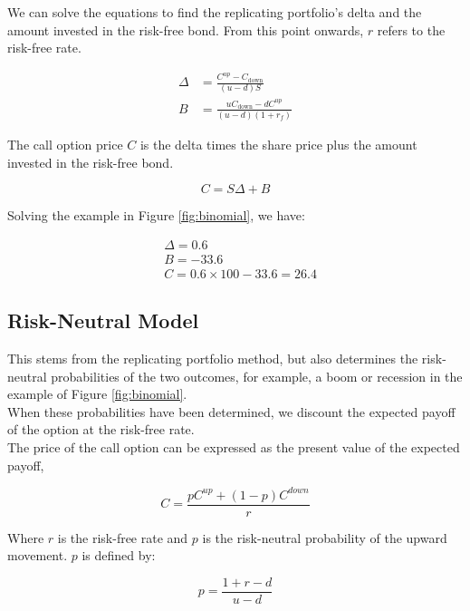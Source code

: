 We can solve the equations to find the replicating portfolio's delta and the amount invested in the risk-free bond. From this point onwards, $r$ refers to the risk-free rate.

\begin{align}
    \Delta&=\frac{C^{up}-C_{\mathrm{down}}}{(u-d)S}\\
    B     &=\frac{uC_{\mathrm{down}}-dC^{up}}{(u-d)(1+r_f)}
\end{align}

The call option price $C$ is the delta times the share price plus the amount invested in the risk-free bond.

\begin{equation}
    C = S\Delta + B
\end{equation}

Solving the example in Figure \ref{fig:binomial}, we have:

\begin{align*}
    &\Delta=0.6 \\
    &B=-33.6 \\
    &C=0.6 \times 100 - 33.6 = 26.4
    \end{align*}

\subsection*{Risk-Neutral Model}

This stems from the replicating portfolio method, but also determines the risk-neutral probabilities of the two outcomes, for example, a boom or recession in the example of Figure \ref{fig:binomial}.\\

When these probabilities have been determined, we discount the expected payoff of the option at the risk-free rate.\\

The price of the call option can be expressed as the present value of the expected payoff,

\begin{equation}
    C = \frac{pC^{up}+(1-p)C^{down}}{r}
\end{equation}

Where $r$ is the risk-free rate and $p$ is the risk-neutral probability of the upward movement. $p$ is defined by:


\begin{equation}
    p = \frac{1+r-d}{u-d}
\end{equation}

